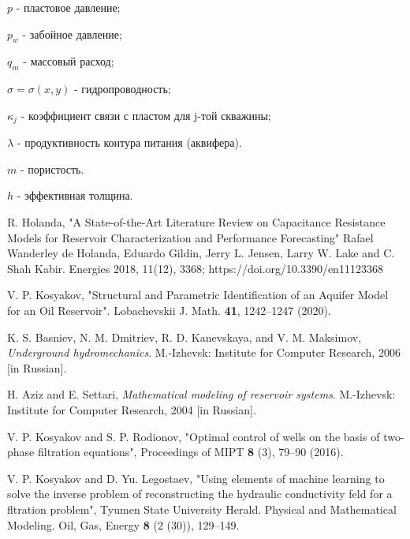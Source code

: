 \documentclass[14pt]{article}
\begin{document}
	$p$ - пластовое давление;
	
	$p_w$ - забойное давление;
	
	$q_m$ - массовый расход;
	
	$\sigma = \sigma(x,y)$ - гидропроводность;
	
	$\kappa_j$ - коэффициент связи с пластом для j-той скважины;
	
	$\lambda$ - продуктивность контура питания (аквифера).
	
	$m$ - пористость.
	
	$h$ - эффективная толщина.
	
	
	\begin{thebibliography}{20}
		
		 R. Holanda, "A State-of-the-Art Literature Review on Capacitance
		Resistance Models for Reservoir Characterization
		and Performance Forecasting" Rafael Wanderley de Holanda, Eduardo Gildin, Jerry L. Jensen, Larry W. Lake and C. Shah Kabir. Energies 2018, 11(12), 3368; https://doi.org/10.3390/en11123368
		
		 V. P. Kosyakov, "Structural and Parametric Identification
		of an Aquifer Model for an Oil Reservoir". Lobachevskii J. Math.
		{\bf 41}, 1242--1247 (2020).
		
		 K. S. Basniev, N. M. Dmitriev, R. D. Kanevskaya, and V. M. Maksimov,
		\textit{Underground hydromechanics}. M.-Izhevsk: Institute for
		Computer Research, 2006 [in Russian].
		
		 H. Aziz and E. Settari, \textit{Mathematical modeling of reservoir systems}.
		M.-Izhevsk: Institute for Computer Research, 2004 [in Russian].
		
		 V. P. Kosyakov and S. P. Rodionov, "Optimal control of wells on the basis
		of two-phase filtration equations", Proceedings of MIPT {\bf 8} (3),
		79--90 (2016).
		
		 V. P. Kosyakov and  D. Yu. Legostaev, "Using elements of machine learning to
		solve the inverse problem of reconstructing the hydraulic 
		conductivity feld for a fltration problem", Tyumen State University
		Herald. Physical and Mathematical Modeling. Oil, Gas, Energy {\bf 8}
		(2 (30)), 129--149.
		
	\end{thebibliography}
	
\end{document}
